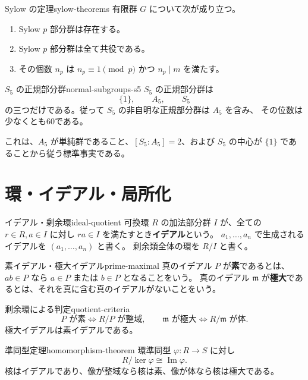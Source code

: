 \begin{theorem}{Sylow の定理}{sylow-theorems}
有限群 $G$ について次が成り立つ。
\begin{enumerate}
  \item Sylow $p$ 部分群は存在する。
  \item Sylow $p$ 部分群は全て共役である。
  \item その個数 $n_p$ は $n_p\equiv1\pmod p$ かつ $n_p\mid m$ を満たす。
\end{enumerate}
\end{theorem}

\begin{theorem}{$S_5$ の正規部分群}{normal-subgroups-s5}
$S_5$ の正規部分群は
\[
\{1\},\qquad A_5,\qquad S_5
\]
の三つだけである。従って $S_5$ の非自明な正規部分群は $A_5$ を含み、
その位数は少なくとも60である。

これは、$A_5$ が単純群であること、$[S_5:A_5]=2$、および
$S_5$ の中心が $\{1\}$ であることから従う標準事実である。
\end{theorem}

\section{環・イデアル・局所化}

\begin{definition}{イデアル・剰余環}{ideal-quotient}
可換環 $R$ の加法部分群 $I$ が、全ての $r\in R,a\in I$ に対し $ra\in I$ を満たすとき\textbf{イデアル}という。
$a_1,\ldots,a_n$ で生成されるイデアルを $(a_1,\ldots,a_n)$ と書く。
剰余類全体の環を $R/I$ と書く。
\end{definition}

\begin{definition}{素イデアル・極大イデアル}{prime-maximal}
真のイデアル $P$ が\textbf{素}であるとは、$ab\in P$ なら $a\in P$ または $b\in P$ となることをいう。
真のイデアル $\mathfrak m$ が\textbf{極大}であるとは、それを真に含む真のイデアルがないことをいう。
\end{definition}

\begin{theorem}{剰余環による判定}{quotient-criteria}
\[
 P\text{ が素}\Longleftrightarrow R/P\text{ が整域},
 \qquad
 \mathfrak m\text{ が極大}\Longleftrightarrow R/\mathfrak m\text{ が体}.
\]
極大イデアルは素イデアルである。
\end{theorem}

\begin{theorem}{準同型定理}{homomorphism-theorem}
環準同型 $\varphi:R\to S$ に対し
\[
 R/\ker\varphi\cong\operatorname{Im}\varphi.
\]
核はイデアルであり、像が整域なら核は素、像が体なら核は極大である。
\end{theorem}

